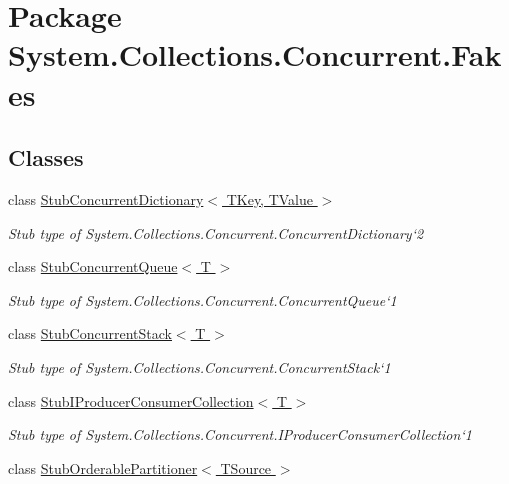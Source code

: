 \hypertarget{namespace_system_1_1_collections_1_1_concurrent_1_1_fakes}{\section{Package System.\-Collections.\-Concurrent.\-Fakes}
\label{namespace_system_1_1_collections_1_1_concurrent_1_1_fakes}
}
\subsection*{Classes}
\begin{DoxyCompactItemize}
\item 
class \hyperlink{class_system_1_1_collections_1_1_concurrent_1_1_fakes_1_1_stub_concurrent_dictionary_3_01_t_key_00_01_t_value_01_4}{Stub\-Concurrent\-Dictionary$<$ T\-Key, T\-Value $>$}
\begin{DoxyCompactList}\small\item\em Stub type of System.\-Collections.\-Concurrent.\-Concurrent\-Dictionary`2\end{DoxyCompactList}\item 
class \hyperlink{class_system_1_1_collections_1_1_concurrent_1_1_fakes_1_1_stub_concurrent_queue_3_01_t_01_4}{Stub\-Concurrent\-Queue$<$ T $>$}
\begin{DoxyCompactList}\small\item\em Stub type of System.\-Collections.\-Concurrent.\-Concurrent\-Queue`1\end{DoxyCompactList}\item 
class \hyperlink{class_system_1_1_collections_1_1_concurrent_1_1_fakes_1_1_stub_concurrent_stack_3_01_t_01_4}{Stub\-Concurrent\-Stack$<$ T $>$}
\begin{DoxyCompactList}\small\item\em Stub type of System.\-Collections.\-Concurrent.\-Concurrent\-Stack`1\end{DoxyCompactList}\item 
class \hyperlink{class_system_1_1_collections_1_1_concurrent_1_1_fakes_1_1_stub_i_producer_consumer_collection_3_01_t_01_4}{Stub\-I\-Producer\-Consumer\-Collection$<$ T $>$}
\begin{DoxyCompactList}\small\item\em Stub type of System.\-Collections.\-Concurrent.\-I\-Producer\-Consumer\-Collection`1\end{DoxyCompactList}\item 
class \hyperlink{class_system_1_1_collections_1_1_concurrent_1_1_fakes_1_1_stub_orderable_partitioner_3_01_t_source_01_4}{Stub\-Orderable\-Partitioner$<$ T\-Source $>$}

\end{DoxyCompactItemize}
